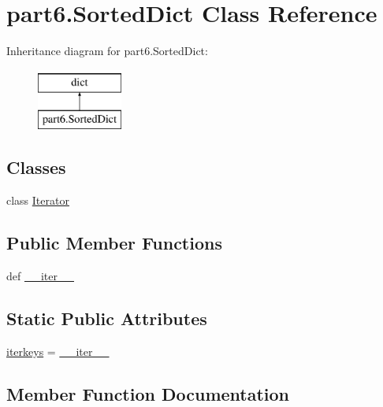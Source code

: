 \hypertarget{classpart6_1_1SortedDict}{}\section{part6.\+Sorted\+Dict Class Reference}
\label{classpart6_1_1SortedDict}
Inheritance diagram for part6.\+Sorted\+Dict\+:\begin{figure}[H]
\begin{center}
\leavevmode
\includegraphics[height=2.000000cm]{classpart6_1_1SortedDict}
\end{center}
\end{figure}
\subsection*{Classes}
\begin{DoxyCompactItemize}
\item 
class \hyperlink{classpart6_1_1SortedDict_1_1Iterator}{Iterator}
\end{DoxyCompactItemize}
\subsection*{Public Member Functions}
\begin{DoxyCompactItemize}
\item 
def \hyperlink{classpart6_1_1SortedDict_a8354f8c45dd26afcf486e0891c58a779}{\+\_\+\+\_\+iter\+\_\+\+\_\+}
\end{DoxyCompactItemize}
\subsection*{Static Public Attributes}
\begin{DoxyCompactItemize}
\item 
\hyperlink{classpart6_1_1SortedDict_aff08f26fd9aa45994aef465c744cdf48}{iterkeys} = \hyperlink{classpart6_1_1SortedDict_a8354f8c45dd26afcf486e0891c58a779}{\+\_\+\+\_\+iter\+\_\+\+\_\+}
\end{DoxyCompactItemize}


\subsection{Member Function Documentation}
\hypertarget{classpart6_1_1SortedDict_a8354f8c45dd26afcf486e0891c58a779}{}
